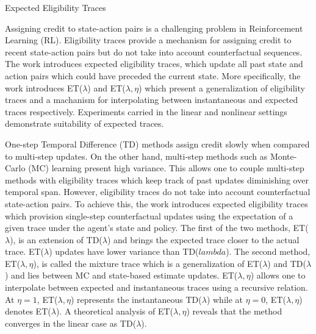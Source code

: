 \documentclass[11pt,letterpaper]{article}
\begin{document}
\begin{center}
  \large{Expected Eligibility Traces}
\end{center}

Assigning credit to state-action pairs is a challenging problem in Reinforcement Learning (RL). Eligibility traces provide a mechanism for assigning credit to recent state-action pairs but do not take into account counterfactual sequences. The work introduces expected eligibility traces, which update all past state and action pairs which could have preceded the current state. More specifically, the work introduces ET($\lambda$) and ET($\lambda,\eta$) which present a generalization of eligibility traces and a machanism for interpolating between instantaneous and expected traces respectively. Experiments carried in the linear and nonlinear settings demonstrate suitability of expected traces. 

One-step Temporal Difference (TD) methods assign credit slowly when compared to multi-step updates. On the other hand, multi-step methods such as Monte-Carlo (MC) learning present high variance. This allows one to couple multi-step methods with eligibility traces which keep track of past updates diminishing over temporal span. However, eligibility traces do not take into account counterfactual state-action pairs. To achieve this, the work introduces expected eligibility traces which provision single-step counterfactual updates using the expectation of a given trace under the agent's state and policy. The first of the two methods, ET($\lambda$), is an extension of TD($\lambda$) and brings the expected trace closer to the actual trace. ET($\lambda$) updates have lower variance than TD($lambda$). The second method, ET($\lambda,\eta$), is called the mixture trace which is a generalization of ET($\lambda$) and TD($\lambda$) and lies between MC and state-based estimate updates. ET($\lambda,\eta$) allows one to interpolate between expected and instantaneous traces using a recursive relation. At $\eta=1$, ET($\lambda,\eta$) represents the instantaneous TD($\lambda$) while at $\eta=0$, ET($\lambda,\eta$) denotes ET($\lambda$). A theoretical analysis of ET($\lambda,\eta$) reveals that the method converges in the linear case as TD($\lambda$). 
\end{document}

